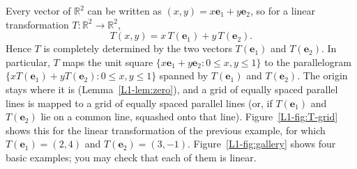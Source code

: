 \begin{remark}
    Every vector of $\mathbb{R}^2$ can be written as $(x, y) = x \mathbf{e}_1 + y \mathbf{e}_2$, so for a linear transformation $T: \mathbb{R}^2 \to \mathbb{R}^2$,
    \[T(x, y) = x\,T(\mathbf{e}_1) + y\,T(\mathbf{e}_2).\]
    Hence $T$ is completely determined by the two vectors $T(\mathbf{e}_1)$ and $T(\mathbf{e}_2)$. In particular, $T$ maps the unit square $\{x \mathbf{e}_1 + y \mathbf{e}_2 : 0 \leq x, y \leq 1\}$ to the parallelogram $\{x T(\mathbf{e}_1) + y T(\mathbf{e}_2) : 0 \leq x, y \leq 1\}$ spanned by $T(\mathbf{e}_1)$ and $T(\mathbf{e}_2)$. The origin stays where it is (Lemma~\ref{L1-lem:zero}), and a grid of equally spaced parallel lines is mapped to a grid of equally spaced parallel lines (or, if $T(\mathbf{e}_1)$ and $T(\mathbf{e}_2)$ lie on a common line, squashed onto that line). Figure~\ref{L1-fig:T-grid} shows this for the linear transformation of the previous example, for which $T(\mathbf{e}_1) = (2, 4)$ and $T(\mathbf{e}_2) = (3, -1)$. Figure~\ref{L1-fig:gallery} shows four basic examples; you may check that each of them is linear.
\end{remark}

